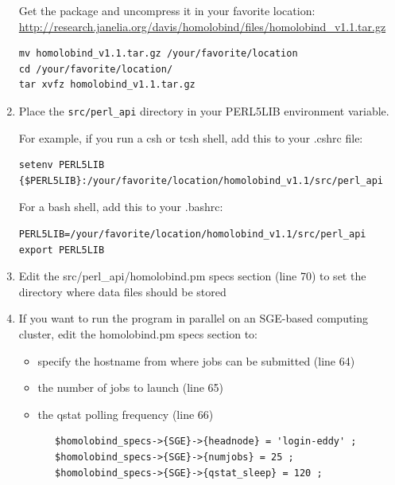 \documentclass[11pt]{article}
\begin{document}
\begin{enumerate}
Get the package and uncompress it in your favorite location:\\ \url{http://research.janelia.org/davis/homolobind/files/homolobind_v1.1.tar.gz}

\lstset{breaklines=true,language=bash,breakatwhitespace=true}
\lstset{frame=single}
\lstset{basicstyle=\ttfamily}
\begin{lstlisting}
mv homolobind_v1.1.tar.gz /your/favorite/location
cd /your/favorite/location/
tar xvfz homolobind_v1.1.tar.gz
\end{lstlisting}

\item Place the {\tt src/perl\_api} directory in your PERL5LIB environment variable.

For example, if you run a csh or tcsh shell, add this to your .cshrc file:
\lstset{breaklines=true,language=bash,breakatwhitespace=true}
\lstset{frame=single}
\lstset{basicstyle=\ttfamily}
\begin{lstlisting}
setenv PERL5LIB {$PERL5LIB}:/your/favorite/location/homolobind_v1.1/src/perl_api
\end{lstlisting}

For a bash shell, add this to your .bashrc:
\lstset{breaklines=true,language=bash,breakatwhitespace=true}
\lstset{frame=single}
\lstset{basicstyle=\ttfamily}
\begin{lstlisting}
PERL5LIB=/your/favorite/location/homolobind_v1.1/src/perl_api
export PERL5LIB
\end{lstlisting}

\item Edit the src/perl\_api/homolobind.pm specs section (line 70) to set the directory where data files should be stored

\item If you want to run the program in parallel on an SGE-based computing cluster, edit the homolobind.pm specs section to:

\begin{itemize}
\item specify the hostname from where jobs can be submitted (line 64)
\item the number of jobs to launch (line 65)
\item the qstat polling frequency (line 66)

\lstset{breaklines=true,language=bash,breakatwhitespace=true}
\lstset{frame=single}
\lstset{basicstyle=\ttfamily}
\begin{lstlisting}
   $homolobind_specs->{SGE}->{headnode} = 'login-eddy' ;
   $homolobind_specs->{SGE}->{numjobs} = 25 ;
   $homolobind_specs->{SGE}->{qstat_sleep} = 120 ;
\end{lstlisting}


\end{itemize}
\end{enumerate}
\end{document}
